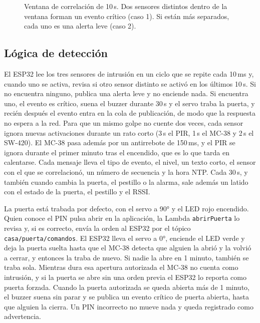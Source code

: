 \documentclass[manuscript,screen,nonacm]{acmart}
\begin{document}
\begin{figure}[htbp]
\centering
{}
\caption{Ventana de correlación de 10\,s. Dos sensores distintos dentro de la ventana forman un evento crítico (caso 1). Si están más separados, cada uno es una alerta leve (caso 2).}
\label{fig:ventana}
\end{figure}

\subsection{Lógica de detección}
El ESP32 lee los tres sensores de intrusión en un ciclo que se repite cada 10\,ms y, cuando uno se activa, revisa si otro sensor distinto se activó en los últimos 10\,s. Si no encuentra ninguno, publica una alerta leve y no enciende nada. Si encuentra uno, el evento es crítico, suena el buzzer durante 30\,s y el servo traba la puerta, y recién después el evento entra en la cola de publicación, de modo que la respuesta no espera a la red. Para que un mismo golpe no cuente dos veces, cada sensor ignora nuevas activaciones durante un rato corto (3\,s el PIR, 1\,s el MC-38 y 2\,s el SW-420). El MC-38 pasa además por un antirrebote de 150\,ms, y el PIR se ignora durante el primer minuto tras el encendido, que es lo que tarda en calentarse. Cada mensaje lleva el tipo de evento, el nivel, un texto corto, el sensor con el que se correlacionó, un número de secuencia y la hora NTP. Cada 30\,s, y también cuando cambia la puerta, el pestillo o la alarma, sale además un latido con el estado de la puerta, el pestillo y el RSSI.

La puerta está trabada por defecto, con el servo a 90° y el LED rojo encendido. Quien conoce el PIN pulsa abrir en la aplicación, la Lambda \texttt{abrirPuerta} lo revisa y, si es correcto, envía la orden al ESP32 por el tópico \texttt{casa/\allowbreak puerta/\allowbreak comandos}. El ESP32 lleva el servo a 0°, enciende el LED verde y deja la puerta suelta hasta que el MC-38 detecta que alguien la abrió y la volvió a cerrar, y entonces la traba de nuevo. Si nadie la abre en 1 minuto, también se traba sola. Mientras dura esa apertura autorizada el MC-38 no cuenta como intrusión, y si la puerta se abre sin una orden previa el ESP32 lo reporta como puerta forzada. Cuando la puerta autorizada se queda abierta más de 1 minuto, el buzzer suena sin parar y se publica un evento crítico de puerta abierta, hasta que alguien la cierra. Un PIN incorrecto no mueve nada y queda registrado como advertencia.
\end{document}
